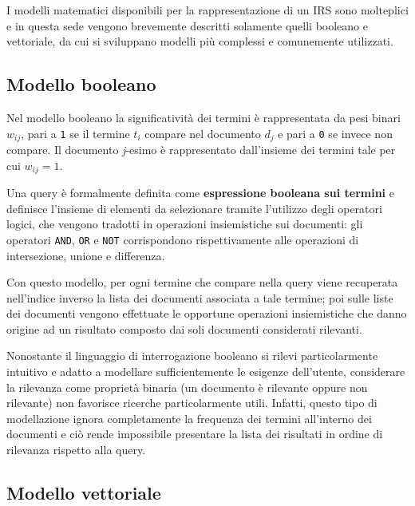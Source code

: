 I modelli matematici disponibili per la rappresentazione di un IRS sono molteplici e in questa sede vengono brevemente descritti solamente quelli booleano e vettoriale, da cui si sviluppano modelli più complessi e comunemente utilizzati.



\subsection{Modello booleano}

Nel modello booleano la significatività dei termini è rappresentata da pesi binari \(w_{ij}\), pari a \texttt{1} se il termine \(t_{i}\) compare nel documento \(d_{j}\) e pari a \texttt{0} se invece non compare. Il documento \textit{j}-esimo è rappresentato dall’insieme dei termini tale per cui \(w_{ij} = 1\).

Una query è formalmente definita come \textbf{espressione booleana sui termini} e definisce l’insieme di elementi da selezionare tramite l’utilizzo degli operatori logici, che vengono tradotti in operazioni insiemistiche sui documenti: gli operatori \texttt{AND}, \texttt{OR} e \texttt{NOT} corrispondono rispettivamente alle operazioni di intersezione, unione e differenza.

Con questo modello, per ogni termine che compare nella query viene recuperata nell’indice inverso la lista dei documenti associata a tale termine; poi sulle liste dei documenti vengono effettuate le opportune operazioni insiemistiche che danno origine ad un risultato composto dai soli documenti considerati rilevanti.

\vspace{1em}

Nonostante il linguaggio di interrogazione booleano si rilevi particolarmente intuitivo e adatto a modellare sufficientemente le esigenze dell’utente, considerare la rilevanza come proprietà binaria (un documento è rilevante oppure non rilevante) non favorisce ricerche particolarmente utili. Infatti, questo tipo di modellazione ignora completamente la frequenza dei termini all’interno dei documenti e ciò rende impossibile presentare la lista dei risultati in ordine di rilevanza rispetto alla query.



\pagebreak
\subsection{Modello vettoriale}

